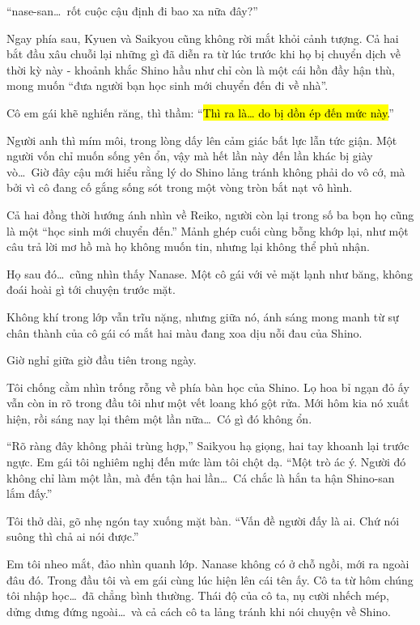 \documentclass[../main.tex]{subfiles}
\begin{document}
``nase-san\dots\ rốt cuộc cậu định đi bao xa nữa đây?''

Ngay phía sau, Kyuen và Saikyou cũng không rời mắt khỏi cảnh tượng. Cả hai bắt đầu xâu chuỗi lại những gì đã diễn ra từ lúc trước khi họ bị chuyển dịch về thời kỳ này - khoảnh khắc Shino hầu như chỉ còn là một cái hồn đầy hận thù, mong muốn ``đưa người bạn học sinh mới chuyển đến đi về nhà''.

Cô em gái khẽ nghiến răng, thì thầm: ``\hl{Thì ra là\dots{} do bị dồn ép đến mức này.}''

Người anh thì mím môi, trong lòng dấy lên cảm giác bất lực lẫn tức giận. Một người vốn chỉ muốn sống yên ổn, vậy mà hết lần này đến lần khác bị giày vò\dots\ Giờ đây cậu mới hiểu rằng lý do Shino lảng tránh không phải do vô cớ, mà bởi vì cô đang cố gắng sống sót trong một vòng tròn bắt nạt vô hình.

Cả hai đồng thời hướng ánh nhìn về Reiko, người còn lại trong số ba bọn họ cũng là một ``học sinh mới chuyển đến.'' Mảnh ghép cuối cùng bỗng khớp lại, như một câu trả lời mơ hồ mà họ không muốn tin, nhưng lại không thể phủ nhận.

Họ sau đó\dots\ cũng nhìn thấy Nanase. Một cô gái với vẻ mặt lạnh như băng, không đoái hoài gì tới chuyện trước mặt.

Không khí trong lớp vẫn trĩu nặng, nhưng giữa nó, ánh sáng mong manh từ sự chân thành của cô gái có mắt hai màu đang xoa dịu nỗi đau của Shino.

\ct


Giờ nghỉ giữa giờ đầu tiên trong ngày.

Tôi chống cằm nhìn trống rỗng về phía bàn học của Shino. Lọ hoa bỉ ngạn đỏ ấy vẫn còn in rõ trong đầu tôi như một vết loang khó gột rửa. Mới hôm kia nó xuất hiện, rồi sáng nay lại thêm một lần nữa\dots\ Có gì đó không ổn.

``Rõ ràng đây không phải trùng hợp,'' Saikyou hạ giọng, hai tay khoanh lại trước ngực. Em gái tôi nghiêm nghị đến mức làm tôi chột dạ. ``Một trò ác ý. Người đó không chỉ làm một lần, mà đến tận hai lần\dots\ Cá chắc là hắn ta hận Shino-san lắm đấy.''

Tôi thở dài, gõ nhẹ ngón tay xuống mặt bàn. ``Vấn đề người đấy là ai. Chứ nói suông thì chả ai nói được.''

Em tôi nheo mắt, đảo nhìn quanh lớp. Nanase không có ở chỗ ngồi, mới ra ngoài đâu đó. Trong đầu tôi và em gái cùng lúc hiện lên cái tên ấy. Cô ta từ hôm chúng tôi nhập học\dots\ đã chẳng bình thường. Thái độ của cô ta, nụ cười nhếch mép, dửng dưng đứng ngoài\dots\ và cả cách cô ta lảng tránh khi nói chuyện về Shino.
\end{document}
